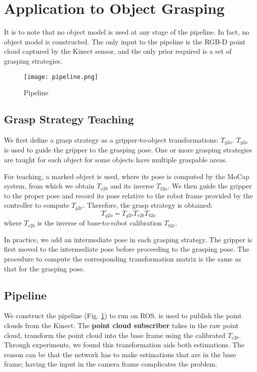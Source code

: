 \documentclass[conference]{IEEEtran}
\begin{document}
\section{Application to Object Grasping}
It is to note that no object model is used at any stage of the pipeline. In fact, no object model is constructed. The only input to the pipeline is the RGB-D point cloud captured by the Kinect sensor, and the only prior required is a set of grasping strategies.

\begin{figure}[htbp]
 \centerline{\texttt{[image: pipeline.png]}}
 \caption{Pipeline}
 \label{fig_pipeline}
\end{figure}
\subsection{Grasp Strategy Teaching}
We first define a grasp strategy as a gripper-to-object transformations: $T_{g2o}$. $T_{g2o}$ is used to guide the gripper to the grasping pose. One or more grasping strategies are taught for each object for some objects have multiple graspable areas.

For teaching, a marked object is used, where its pose is computed by the MoCap system, from which we obtain $T_{o2b}$ and its inverse $T_{b2o}$. We then guide the gripper to the proper pose and record its pose relative to the robot frame provided by the controller to compute $T_{g2r}$. Therefore, the grasp strategy is obtained:
$$T_{g2o} = T_{g2r}T_{r2b}T_{b2o}$$
where $T_{r2b}$ is the inverse of base-to-robot calibration $T_{b2r}$.

In practice, we add an intermediate pose in each grasping strategy. The gripper is first moved to the intermediate pose before proceeding to the grasping pose. The procedure to compute the corresponding transformation matrix is the same as that for the grasping pose.

\subsection{Pipeline}
We construct the pipeline (Fig. \ref{fig_pipeline}) to run on ROS. \cite{iai_kinect2} is used to publish the point clouds from the Kinect. The \textbf{point cloud subscriber} takes in the raw point cloud, transform the point cloud into the base frame using the calibrated $T_{c2b}$. Through experiments, we found this transformation aids both estimations. The reason can be that the network has to make estimations that are in the base frame; having the input in the camera frame complicates the problem.
\end{document}

